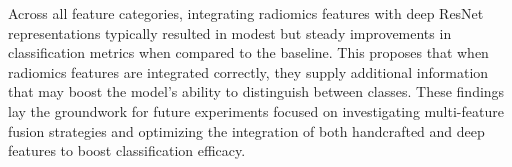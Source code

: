 Across all feature categories, integrating radiomics features with deep ResNet representations typically resulted in modest but steady improvements in classification metrics when compared to the baseline. This proposes that when radiomics features are integrated correctly, they supply additional information that may boost the model’s ability to distinguish between classes.
These findings lay the groundwork for future experiments focused on investigating multi-feature fusion strategies and optimizing the integration of both handcrafted and deep features to boost classification efficacy.


